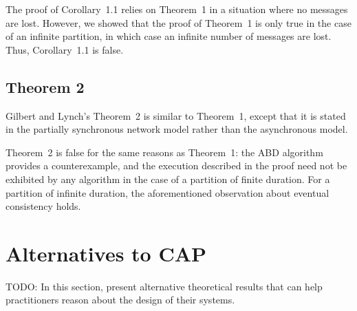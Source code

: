 \documentclass[a4paper,twocolumn,10pt]{article}
\begin{document}
The proof of Corollary~1.1 relies on Theorem~1 in a situation where no messages are lost. However,
we showed that the proof of Theorem~1 is only true in the case of an infinite partition, in which
case an infinite number of messages are lost. Thus, Corollary~1.1 is false.

\subsection{Theorem 2}\label{sec:theorem2}

Gilbert and Lynch's Theorem~2 is similar to Theorem~1, except that it is stated in the partially
synchronous network model rather than the asynchronous model.

Theorem~2 is false for the same reasons as Theorem~1: the ABD algorithm provides a counterexample,
and the execution described in the proof need not be exhibited by any algorithm in the case of a
partition of finite duration. For a partition of infinite duration, the aforementioned observation
about eventual consistency holds.

%
%
%

\section{Alternatives to CAP}\label{sec:alternatives}

TODO: In this section, present alternative theoretical results that can help practitioners reason
about the design of their systems.

\end{document}
